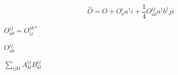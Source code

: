 \documentclass{article}
\begin{document}
\[ \hat O = O + O^i_a a^\dagger i + \frac14 O^{ij}_{ab} a^\dagger b^\dagger j i \]
\pagebreak

$O^{ij}_{ab}=O_{ij}^{ab*}$
\pagebreak

$O^{ij}_{ab}$
\pagebreak

$\sum_{ijkl} A^{ij}_{kl} B^{ij}_{kl}$
\pagebreak
\end{document}
